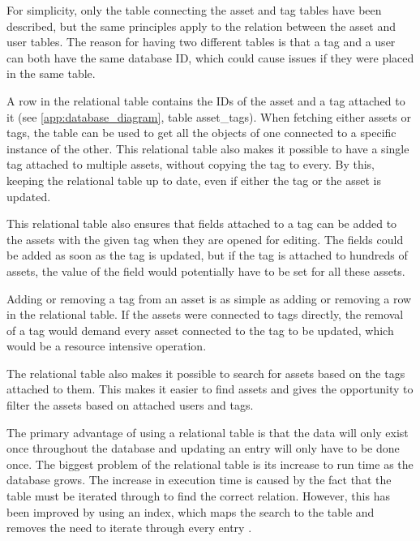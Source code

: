 For simplicity, only the table connecting the asset and tag tables have been described, but the same principles apply to the relation between the asset and user tables. The reason for having two different tables is that a tag and a user can both have the same database ID, which could cause issues if they were placed in the same table.
\par
A row in the relational table contains the IDs of the asset and a tag attached to it (see \autoref{app:database_diagram}, table asset\_tags). When fetching either assets or tags, the table can be used to get all the objects of one connected to a specific instance of the other. This relational table also makes it possible to have a single tag attached to multiple assets, without copying the tag to every. By this, keeping the relational table up to date, even if either the tag or the asset is updated.
\par
This relational table also ensures that fields attached to a tag can be added to the assets with the given tag when they are opened for editing. The fields could be added as soon as the tag is updated, but if the tag is attached to hundreds of assets, the value of the field would potentially have to be set for all these assets.
\par
Adding or removing a tag from an asset is as simple as adding or removing a row in the relational table. If the assets were connected to tags directly, the removal of a tag would demand every asset connected to the tag to be updated, which would be a resource intensive operation.
\par
The relational table also makes it possible to search for assets based on the tags attached to them. This makes it easier to find assets and gives the opportunity to filter the assets based on attached users and tags.
\par
The primary advantage of using a relational table is that the data will only exist once throughout the database and updating an entry will only have to be done once. The biggest problem of the relational table is its increase to run time as the database grows. The increase in execution time is caused by the fact that the table must be iterated through to find the correct relation. However, this has been improved by using an index, which maps the search to the table and removes the need to iterate through every entry \citep{RelationalTable}.
\par




